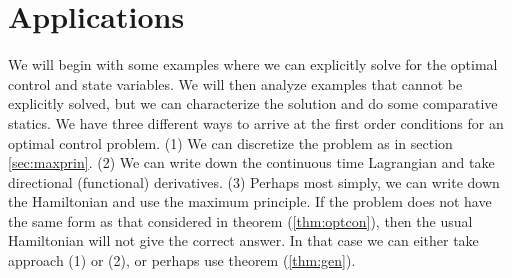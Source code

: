 
\section{Applications}

We will begin with some examples where we can explicitly solve for the
optimal control and state variables. We will then analyze examples
that cannot be explicitly solved, but we can characterize the
solution and do some comparative statics. We have three different ways
to arrive at the first order conditions for an optimal control
problem. (1) We can discretize the problem as in section
\ref{sec:maxprin}. (2) We can write down the continuous time Lagrangian
and take directional (functional) derivatives. (3) Perhaps most
simply, we can write down the Hamiltonian and use the maximum
principle. If the problem does not have the same form as that
considered in theorem (\ref{thm:optcon}), then the usual Hamiltonian
will not give the correct answer. In that case we can either take
approach (1) or (2), or perhaps use theorem (\ref{thm:gen}). 

